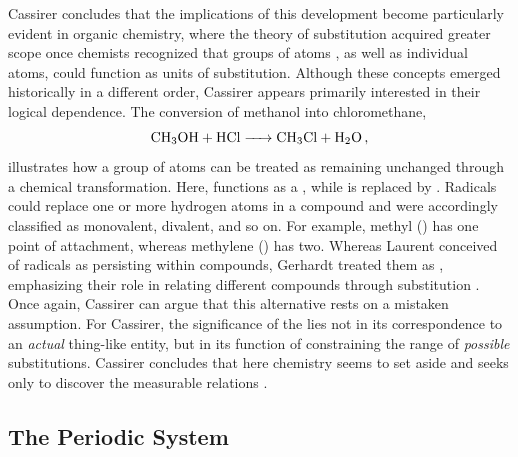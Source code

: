 \documentclass[submitted,12pt]{article}
\begin{document}
Cassirer concludes that the implications of this development become particularly evident in organic chemistry, where the theory of substitution acquired greater scope once chemists recognized that groups of atoms , as well as individual atoms, could function as units of substitution. Although these concepts emerged historically in a different order, Cassirer appears primarily interested in their logical dependence. The conversion of methanol into chloromethane, $$\ce{CH3OH + HCl -> CH3Cl + H2O}\,,$$ illustrates how a group of atoms can be treated as remaining unchanged through a chemical transformation. Here,  functions as a  , while  is replaced by . Radicals could replace one or more hydrogen atoms in a compound and were accordingly classified as monovalent, divalent, and so on. For example, methyl () has one point of attachment, whereas methylene () has two. Whereas Laurent conceived of radicals as  persisting within compounds, Gerhardt treated them as , emphasizing their role in relating different compounds through substitution . Once again, Cassirer can argue that this alternative \citep[175, 189ff.]{Ladenburg1902} rests on a mistaken assumption. For Cassirer, the significance of the   lies not in its correspondence to an \emph{actual} thing-like entity, but in its function of constraining the range of \emph{possible} substitutions. Cassirer concludes that here chemistry seems to set aside  and seeks only to discover the measurable relations  .



\subsection{The Periodic System}
\end{document}
